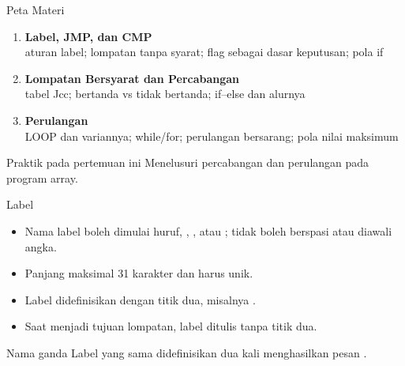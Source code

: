 \documentclass[aspectratio=169,11pt]{beamer}
\begin{document}
\begin{frame}{Peta Materi}
\small
\begin{enumerate}
    \item \textbf{Label, JMP, dan CMP}\\
          {\footnotesize aturan label; lompatan tanpa syarat; flag
          sebagai dasar keputusan; pola if}

    \vspace{0.25em}
    \item \textbf{Lompatan Bersyarat dan Percabangan}\\
          {\footnotesize tabel Jcc; bertanda vs tidak bertanda;
          if--else dan alurnya}

    \vspace{0.25em}
    \item \textbf{Perulangan}\\
          {\footnotesize LOOP dan variannya; while/for; perulangan
          bersarang; pola nilai maksimum}
\end{enumerate}

\vspace{0.35em}
\begin{block}{Praktik pada pertemuan ini}
\small Menelusuri percabangan dan perulangan pada program array.
\end{block}
\end{frame}


\begin{frame}{Label}
\small
\begin{itemize}
    \item Nama label boleh dimulai huruf, , \code{\_}, atau
          ; tidak boleh berspasi atau diawali angka.

    \vspace{0.18em}
    \item Panjang maksimal 31 karakter dan harus unik.

    \vspace{0.18em}
    \item Label didefinisikan dengan titik dua, misalnya
          .

    \vspace{0.18em}
    \item Saat menjadi tujuan lompatan, label ditulis tanpa titik dua.
\end{itemize}

\vspace{0.25em}
\begin{alertblock}{Nama ganda}
\small Label yang sama didefinisikan dua kali menghasilkan pesan
.
\end{alertblock}
\end{frame}
\end{document}
